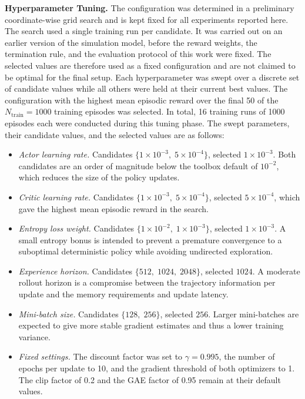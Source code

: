 \documentclass{ieeeaccess}
\begin{document}
\textbf{Hyperparameter Tuning.} The configuration was determined in a preliminary
coordinate-wise grid search and is kept fixed for all experiments reported here. The search
used a single training run per candidate. It was carried out on an earlier version of the simulation
model, before the reward weights, the termination rule, and the evaluation protocol of this work were
fixed. The selected values are therefore used as a fixed configuration and are not claimed to be optimal
for the final setup. Each hyperparameter was swept over a discrete set of candidate values while all
others were held at their current best values. The configuration with the highest mean episodic reward
over the final 50 of the $N_{\mathrm{train}}=1000$ training episodes was selected. In total, 16 training
runs of 1000 episodes each were conducted during this tuning phase. The swept parameters, their candidate
values, and the selected values are as follows:
\begin{itemize}
  \item \textit{Actor learning rate.} Candidates $\{1\!\times\!10^{-3},\;5\!\times\!10^{-4}\}$,
  selected $1\!\times\!10^{-3}$. Both candidates are an order of magnitude below the toolbox
  default of $10^{-2}$, which reduces the size of the policy updates.
  \item \textit{Critic learning rate.} Candidates $\{1\!\times\!10^{-3},\;5\!\times\!10^{-4}\}$,
  selected $5\!\times\!10^{-4}$, which gave the highest mean episodic reward in the search.
  \item \textit{Entropy loss weight.} Candidates $\{1\!\times\!10^{-2},\;1\!\times\!10^{-3}\}$, selected
  $1\!\times\!10^{-3}$. A small entropy bonus is intended to prevent a premature convergence to a
  suboptimal deterministic policy while avoiding undirected exploration.
  \item \textit{Experience horizon.} Candidates $\{512,\;1024,\;2048\}$, selected $1024$. A moderate rollout horizon
  is a compromise between the trajectory information per update and the memory requirements and update latency.
  \item \textit{Mini-batch size.} Candidates $\{128,\;256\}$, selected $256$. Larger mini-batches are expected to give
  more stable gradient estimates and thus a lower training variance.
  \item \textit{Fixed settings.} The discount factor was set to $\gamma = 0.995$,
  the number of epochs per update to 10, and the gradient threshold of both optimizers to 1. The
  clip factor of 0.2 and the GAE factor of 0.95 remain at their default values.
\end{itemize}
\end{document}
